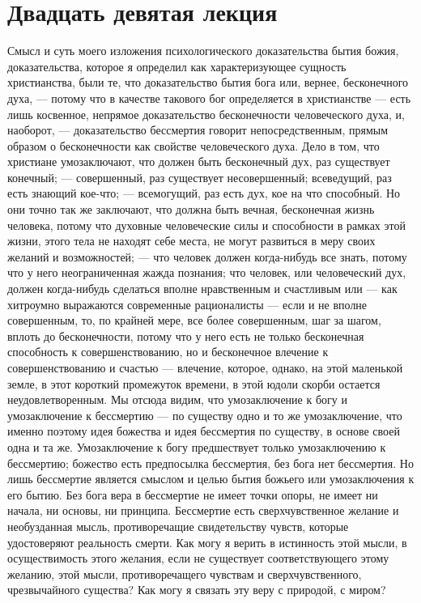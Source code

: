\documentclass[12pt]{article}
\begin{document}
{}
\section*{Двадцать девятая лекция}

Смысл и суть моего изложения психологического доказательства бытия божия, доказательства, которое я определил как характеризующее сущность христианства, были те, что доказательство бытия бога или, вернее, бесконечного духа, --- потому что в качестве такового бог определяется в христианстве --- есть лишь косвенное, непрямое доказательство бесконечности человеческого духа, и, наоборот, --- доказательство бессмертия говорит непосредственным, прямым образом о бесконечности как свойстве человеческого духа. Дело в том, что христиане умозаключают, что должен быть бесконечный дух, раз существует конечный; --- совершенный, раз существует несовершенный; всеведущий, раз есть знающий кое-что; --- всемогущий, раз есть дух, кое на что способный. Но они точно так же заключают, что должна быть вечная, бесконечная жизнь человека, потому что духовные человеческие силы и способности в рамках этой жизни, этого тела не находят себе места, не могут развиться в меру своих желаний и возможностей; --- что человек должен когда-нибудь все знать, потому что у него неограниченная жажда познания; что человек, или человеческий дух, должен когда-нибудь сделаться вполне нравственным и счастливым или --- как хитроумно выражаются современные рационалисты --- если и не вполне совершенным, то, по крайней мере, все более совершенным, шаг за шагом, вплоть до бесконечности, потому что у него есть не только бесконечная способность к совершенствованию, но и бесконечное влечение к совершенствованию и счастью --- влечение, которое, однако, на этой маленькой земле, в этот короткий промежуток времени, в этой юдоли скорби остается неудовлетворенным. Мы отсюда видим, что умозаключение к богу и умозаключение к бессмертию --- по существу одно и то же умозаключение, что именно поэтому идея божества и идея бессмертия по существу, в основе своей одна и та же. Умозаключение к богу предшествует только умозаключению к бессмертию; божество есть предпосылка бессмертия, без бога нет бессмертия. Но лишь бессмертие является смыслом и целью бытия божьего или умозаключения к его бытию. Без бога вера в бессмертие не имеет точки опоры, не имеет ни начала, ни основы, ни принципа. Бессмертие есть сверхчувственное желание и необузданная мысль, противоречащие свидетельству чувств, которые удостоверяют реальность смерти. Как могу я верить в истинность этой мысли, в осуществимость этого желания, если не существует соответствующего этому желанию, этой мысли, противоречащего чувствам и сверхчувственного, чрезвычайного существа? Как могу я связать эту веру с природой, с миром? 
\end{document}
